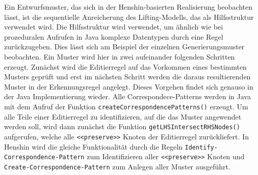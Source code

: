 Ein Entwurfsmuster, das sich in der Henshin-basierten Realisierung beobachten lässt, ist die
sequentielle Anreicherung des Lifting-Modells, das als Hilfsstruktur verwendet wird. Die
Hilfsstruktur wird verwendet, um ähnlich wie bei prozeduralen Aufrufen in Java komplexe Datentypen
durch eine Regel zurückzugeben. Dies lässt sich am Beispiel der einzelnen Generierungsmuster
beobachten. Ein Muster wird hier in zwei aufeinander folgenden Schritten erzeugt. Zunächst wird die
Editierregel auf das Vorkommen eines bestimmten Musters geprüft und erst im nächsten Schritt werden
die daraus resultierenden Muster in der Erkennungsregel angelegt. Dieses Vorgehen findet sich
genauso in der Java Implementierung wieder. Alle Correspondece-Patterns werden in Java mit dem
Aufruf der Funktion \texttt{createCorrespondencePatterns()} erzeugt. Um alle Teile einer
Editierregel zu identifizieren, auf die das Muster angewendet werden soll, wird dann zunächst die
Funktion \texttt{getLHSIntersectRHSNodes()} aufgerufen, welche alle \texttt{<<preserve>>} Knoten der
Editierregel zurückliefert. In Henshin wird die gleiche Funktionalität durch die Regeln
\texttt{Identify-Correspondence-Pattern} zum Identifizieren aller \texttt{<<preserve>>} Knoten und
\texttt{Create-Correspondence-Pattern} zum Anlegen aller Muster ausgeführt.

